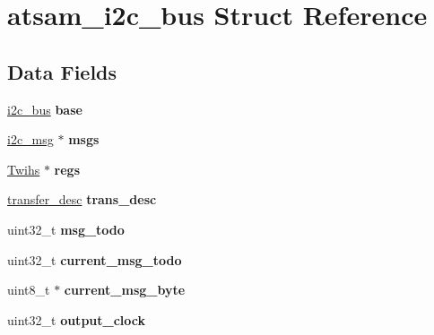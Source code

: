 \hypertarget{structatsam__i2c__bus}{}\section{atsam\+\_\+i2c\+\_\+bus Struct Reference}
\label{structatsam__i2c__bus}
\subsection*{Data Fields}
\begin{DoxyCompactItemize}
\item 
\mbox{\label{structatsam__i2c__bus_a06e56f2fcdcb47a9ab305e4e44db013a}} 
\mbox{\hyperlink{structi2c__bus}{i2c\+\_\+bus}} {\bfseries base}
\item 
\mbox{\label{structatsam__i2c__bus_a3a36727dbd1cf05e6eff1ddb8a91b820}} 
\mbox{\hyperlink{structi2c__msg}{i2c\+\_\+msg}} $\ast$ {\bfseries msgs}
\item 
\mbox{\label{structatsam__i2c__bus_a828d0c9acd80a0ed0ce52d5be0180b28}} 
\mbox{\hyperlink{structTwihs}{Twihs}} $\ast$ {\bfseries regs}
\item 
\mbox{\label{structatsam__i2c__bus_a3d2bdf32080c345fa43b51bbcc765b24}} 
\mbox{\hyperlink{structtransfer__desc}{transfer\+\_\+desc}} {\bfseries trans\+\_\+desc}
\item 
\mbox{\label{structatsam__i2c__bus_a97eef9ca2c49b8aee488b464505da228}} 
uint32\+\_\+t {\bfseries msg\+\_\+todo}
\item 
\mbox{\label{structatsam__i2c__bus_a72ff98d04560db041a737f085c91fec9}} 
uint32\+\_\+t {\bfseries current\+\_\+msg\+\_\+todo}
\item 
\mbox{\label{structatsam__i2c__bus_a0a26840b5444a1a1d22fbfedb41ff260}} 
uint8\+\_\+t $\ast$ {\bfseries current\+\_\+msg\+\_\+byte}
\item 
\mbox{\label{structatsam__i2c__bus_a97279e974a46d920afa5edaafab4496c}} 
uint32\+\_\+t {\bfseries output\+\_\+clock}
\item 

\end{DoxyCompactItemize}
